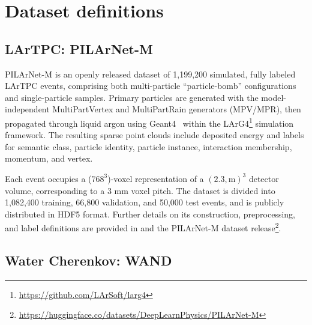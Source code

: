 \section{Dataset definitions}

\subsection{LArTPC: PILArNet-M}

 PILArNet-M is an openly released dataset of 1,199,200 simulated, fully labeled LArTPC events, comprising both multi-particle “particle-bomb” configurations
  and single-particle samples. Primary particles are generated with the model-independent MultiPartVertex and MultiPartRain generators (MPV/MPR), then
  propagated through liquid argon using Geant4~\citep{geant4} within the LArG4\footnote{\url{https://github.com/LArSoft/larg4}} simulation framework. The resulting sparse point clouds include deposited energy and
  labels for semantic class, particle identity, particle instance, interaction membership, momentum, and vertex.
  
  Each event occupies a ($768^3$)-voxel representation of a $(2.3,\mathrm{m})^3$ detector volume, corresponding to a 3 mm voxel pitch. The dataset is divided
  into 1,082,400 training, 66,800 validation, and 50,000 test events, and is publicly distributed in HDF5 format. Further details on its construction,
  preprocessing, and label definitions are provided in \cite{polarmae} and the PILArNet-M dataset release\footnote{ \url{https://huggingface.co/datasets/DeepLearnPhysics/PILArNet-M}}.


\subsection{Water Cherenkov: WAND}






